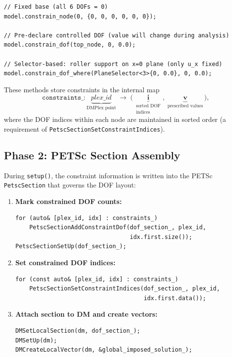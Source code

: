 \begin{lstlisting}
// Fixed base (all 6 DOFs = 0)
model.constrain_node(0, {0, 0, 0, 0, 0, 0});

// Pre-declare controlled DOF (value will change during analysis)
model.constrain_dof(top_node, 0, 0.0);

// Selector-based: roller support on x=0 plane (only u_x fixed)
model.constrain_dof_where(PlaneSelector<3>{0, 0.0}, 0, 0.0);
\end{lstlisting}

These methods store constraints in the internal map
\begin{equation}
  \texttt{constraints\_} :
    \underbrace{\mathit{plex\_id}}_{\text{DMPlex point}}
    \;\longrightarrow\;
    \bigl(\,
      \underbrace{\mathbf{i}}_{\substack{\text{sorted DOF}\\\text{indices}}},\;
      \underbrace{\mathbf{v}}_{\text{prescribed values}}
    \,\bigr),
  \label{eq:constraint-map}
\end{equation}
where the DOF indices within each node are maintained in sorted order
(a requirement of \texttt{PetscSectionSetConstraintIndices}).

\subsection{Phase 2: PETSc Section Assembly}
\label{ssec:bc-section-assembly}

During \verb|setup()|, the constraint information is written into the
PETSc \texttt{PetscSection} that governs the DOF layout:

\begin{enumerate}
  \item \textbf{Mark constrained DOF counts:}
    \begin{lstlisting}[basicstyle=\small\ttfamily]
for (auto& [plex_id, idx] : constraints_)
    PetscSectionAddConstraintDof(dof_section_, plex_id,
                                 idx.first.size());
PetscSectionSetUp(dof_section_);
    \end{lstlisting}
  \item \textbf{Set constrained DOF indices:}
    \begin{lstlisting}[basicstyle=\small\ttfamily]
for (const auto& [plex_id, idx] : constraints_)
    PetscSectionSetConstraintIndices(dof_section_, plex_id,
                                     idx.first.data());
    \end{lstlisting}
  \item \textbf{Attach section to DM and create vectors:}
    \begin{lstlisting}[basicstyle=\small\ttfamily]
DMSetLocalSection(dm, dof_section_);
DMSetUp(dm);
DMCreateLocalVector(dm, &global_imposed_solution_);
    \end{lstlisting}
\end{enumerate}


